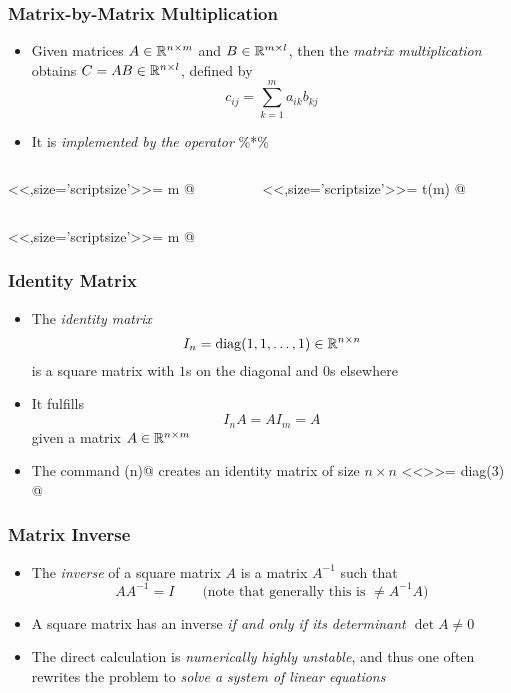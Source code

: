 \documentclass[%
  final,
  11pt, 
  show notes, %
  t, %
  fleqn, %
]{beamer}
\begin{document}
\begin{frame}[fragile]
  \frametitle{Matrix-by-Matrix Multiplication}
\begin{itemize}
\item Given matrices $A \in\mathbb{R}^{n \times m}$ and $B \in\mathbb{R}^{m \times l}$, then the \emph{matrix multiplication} obtains $C = AB \in\mathbb{R}^{n \times l}$, defined by
\begin{equation*}
c_{ij} = \sum_{k=1}^{m} a_{ik} b_{kj}
\end{equation*}
\item It is \emph{implemented by the operator} \%*\%
\end{itemize}
\vspace*{-0.4cm}
\begin{columns}[T]
\begin{column}{.45\textwidth}
<<,size='scriptsize'>>=
m
@
\end{column}
\begin{column}{.45\textwidth}
<<,size='scriptsize'>>=
t(m)
@
\end{column}
\end{columns}
<<,size='scriptsize'>>=
m %
@
\end{frame}

\begin{frame}[fragile]
  \frametitle{Identity Matrix}
\begin{itemize}
\item The \emph{identity matrix}
\begin{equation*}
I_n = \operatorname{diag}(1, 1, \ldots, 1) \in\mathbb{R}^{n \times n}
\end{equation*}
is a square matrix with $1$s on the diagonal and $0$s elsewhere
\item It fulfills 
\begin{equation*}
I_n A = A I_m = A
\end{equation*}
given a matrix $A \in\mathbb{R}^{n \times m}$
\item The command \verb@diag(n)@ creates an identity matrix of size $n \times n$
<<>>=
diag(3)
@
\end{itemize}
\end{frame}

\begin{frame}[fragile]
  \frametitle{Matrix Inverse}
\begin{itemize}
\item The \emph{inverse} of a square matrix $A$ is a matrix $A^{-1}$ such that 
\begin{equation*}
A A^{-1} = I
\qquad
\text{(note that generally this is $\neq A^{-1} A$)}
\end{equation*}
\item A square matrix has an inverse \emph{if and only if its determinant $\det A \neq 0$}
\item The direct calculation is \emph{numerically highly unstable}, and thus one often rewrites the problem to \emph{solve a system of linear equations}
\end{itemize}
\end{frame}
\end{document}

